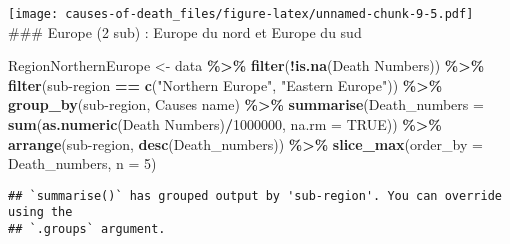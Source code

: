 \documentclass[
]{article}
\newenvironment{Shaded}{\begin{snugshade}}{\end{snugshade}}
\newcommand{\AttributeTok}[1]{\textcolor[rgb]{0.13,0.29,0.53}{#1}}
\newcommand{\ConstantTok}[1]{\textcolor[rgb]{0.56,0.35,0.01}{#1}}
\newcommand{\DecValTok}[1]{\textcolor[rgb]{0.00,0.00,0.81}{#1}}
\newcommand{\FunctionTok}[1]{\textcolor[rgb]{0.13,0.29,0.53}{\textbf{#1}}}
\newcommand{\NormalTok}[1]{#1}
\newcommand{\OtherTok}[1]{\textcolor[rgb]{0.56,0.35,0.01}{#1}}
\newcommand{\SpecialCharTok}[1]{\textcolor[rgb]{0.81,0.36,0.00}{\textbf{#1}}}
\newcommand{\StringTok}[1]{\textcolor[rgb]{0.31,0.60,0.02}{#1}}
\begin{document}
\texttt{[image: causes-of-death\_files/figure-latex/unnamed-chunk-9-5.pdf]}
\#\#\# Europe (2 sub) : Europe du nord et Europe du sud

\begin{Shaded}
\begin{Highlighting}[]
\NormalTok{RegionNorthernEurope }\OtherTok{\textless{}{-}}\NormalTok{ data }\SpecialCharTok{\%\textgreater{}\%}
  \FunctionTok{filter}\NormalTok{(}\SpecialCharTok{!}\FunctionTok{is.na}\NormalTok{(}\StringTok{\textasciigrave{}}\AttributeTok{Death Numbers}\StringTok{\textasciigrave{}}\NormalTok{)) }\SpecialCharTok{\%\textgreater{}\%}
  \FunctionTok{filter}\NormalTok{(}\StringTok{\textasciigrave{}}\AttributeTok{sub{-}region}\StringTok{\textasciigrave{}} \SpecialCharTok{==} \FunctionTok{c}\NormalTok{(}\StringTok{"Northern Europe"}\NormalTok{, }\StringTok{"Eastern Europe"}\NormalTok{)) }\SpecialCharTok{\%\textgreater{}\%}
  \FunctionTok{group\_by}\NormalTok{(}\StringTok{\textasciigrave{}}\AttributeTok{sub{-}region}\StringTok{\textasciigrave{}}\NormalTok{, }\StringTok{\textasciigrave{}}\AttributeTok{Causes name}\StringTok{\textasciigrave{}}\NormalTok{) }\SpecialCharTok{\%\textgreater{}\%}
  \FunctionTok{summarise}\NormalTok{(}\AttributeTok{Death\_numbers =} \FunctionTok{sum}\NormalTok{(}\FunctionTok{as.numeric}\NormalTok{(}\StringTok{\textasciigrave{}}\AttributeTok{Death Numbers}\StringTok{\textasciigrave{}}\NormalTok{)}\SpecialCharTok{/}\DecValTok{1000000}\NormalTok{, }\AttributeTok{na.rm =} \ConstantTok{TRUE}\NormalTok{)) }\SpecialCharTok{\%\textgreater{}\%}
  \FunctionTok{arrange}\NormalTok{(}\StringTok{\textasciigrave{}}\AttributeTok{sub{-}region}\StringTok{\textasciigrave{}}\NormalTok{, }\FunctionTok{desc}\NormalTok{(Death\_numbers)) }\SpecialCharTok{\%\textgreater{}\%}
  \FunctionTok{slice\_max}\NormalTok{(}\AttributeTok{order\_by =}\NormalTok{ Death\_numbers, }\AttributeTok{n =} \DecValTok{5}\NormalTok{)}
\end{Highlighting}
\end{Shaded}

\begin{verbatim}
## `summarise()` has grouped output by 'sub-region'. You can override using the
## `.groups` argument.
\end{verbatim}
\end{document}
